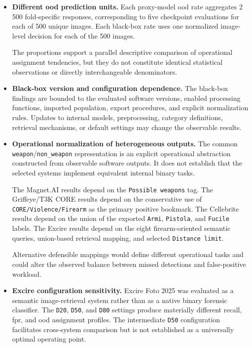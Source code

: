 \begin{itemize}
The selected black-box software systems do not expose a homogeneous numerical
score suitable for an equivalent cross-system analysis. Exported percentages,
tags, retrieval membership, classifications, and bookmarks have different
semantics and cannot be converted into directly comparable calibrated
probabilities.

\item \textbf{Different \gls{ood} prediction units.}
Each proxy-model \gls{ood} rate aggregates 2\,500 fold-specific responses,
corresponding to five checkpoint evaluations for each of 500 unique images.
Each black-box rate uses one normalized image-level decision for each of the 500
images.

The proportions support a parallel descriptive comparison of operational
assignment tendencies, but they do not constitute identical statistical
observations or directly interchangeable denominators.

\item \textbf{Black-box version and configuration dependence.}
The black-box findings are bounded to the evaluated software versions, enabled
processing functions, imported population, export procedures, and explicit
normalization rules. Updates to internal models, preprocessing, category
definitions, retrieval mechanisms, or default settings may change the
observable results.

\item \textbf{Operational normalization of heterogeneous outputs.}
The common \texttt{weapon}/\texttt{non\_weapon} representation is an explicit
operational abstraction constructed from observable software outputs. It does
not establish that the selected systems implement equivalent internal binary
tasks.

The Magnet.AI results depend on the \texttt{Possible weapons} tag. The
Griffeye/T3K CORE results depend on the conservative use of
\texttt{CORE/Violence/Firearm} as the primary positive bookmark. The Cellebrite
results depend on the union of the exported \texttt{Armi}, \texttt{Pistola},
and \texttt{Fucile} labels. The Excire results depend on the eight
firearm-oriented semantic queries, union-based retrieval mapping, and selected
\texttt{Distance limit}.

Alternative defensible mappings would define different operational tasks and
could alter the observed balance between missed detections and false-positive
workload.

\item \textbf{Excire configuration sensitivity.}
Excire Foto 2025 was evaluated as a semantic image-retrieval system rather than
as a native binary forensic classifier. The \texttt{D20}, \texttt{D50}, and
\texttt{D80} settings produce materially different recall, \gls{fpr}, and
\gls{ood} assignment profiles. The intermediate \texttt{D50} configuration
facilitates cross-system comparison but is not established as a universally
optimal operating point.


\end{itemize}
